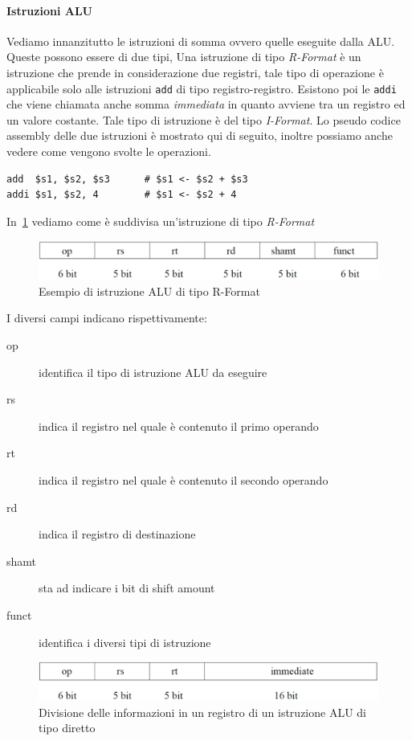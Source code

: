 \paragraph{Istruzioni ALU}
Vediamo innanzitutto le istruzioni di somma ovvero quelle eseguite dalla ALU. Queste possono essere di due tipi,
Una istruzione di tipo \emph{R-Format} è un istruzione che prende in considerazione due registri, tale tipo di operazione è applicabile solo alle istruzioni \texttt{add} di tipo registro-registro. Esistono poi le \texttt{addi} che viene chiamata anche somma \emph{immediata} in quanto avviene tra un registro ed un valore costante. Tale tipo di istruzione è del tipo \emph{I-Format}.
Lo pseudo codice assembly  delle due istruzioni è mostrato qui di seguito, inoltre possiamo anche vedere come vengono svolte le operazioni.
\begin{verbatim}
add  $s1, $s2, $s3      # $s1 <- $s2 + $s3
addi $s1, $s2, 4        # $s1 <- $s2 + 4
\end{verbatim}
In \figurename\,\ref{fig:regALU} vediamo come è suddivisa un'istruzione di tipo \emph{R-Format} 
\begin{figure}[htb]
\centering
\includegraphics[scale=0.4]{img/regALU.png}
\caption{Esempio di istruzione ALU di tipo R-Format}\label{fig:regALU}
\end{figure}
I diversi campi indicano rispettivamente:
\begin{description}
\item[op] identifica il tipo di istruzione ALU da eseguire
\item[rs] indica il registro nel quale è contenuto il primo operando
\item[rt] indica il registro nel quale è contenuto il secondo operando
\item[rd] indica il registro di destinazione
\item[shamt] sta ad indicare i bit di shift amount
\item[funct] identifica i diversi tipi di istruzione
\end{description}
\begin{figure}[htb]
\centering
\includegraphics[scale=0.4]{img/ALUdir.png}
\caption{Divisione delle informazioni in un registro di un istruzione ALU di tipo diretto}\label{fig:ALUdir}
\end{figure}
